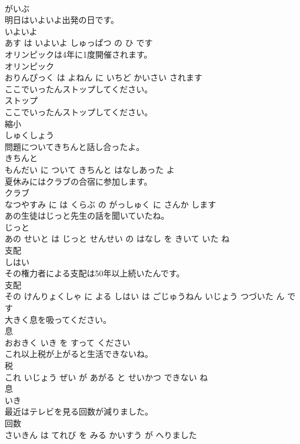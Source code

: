 \documentclass[8pt]{extreport}
\begin{document}
\begin{CJK}{UTF8}{min}
\\	がいぶ			
\\	明日はいよいよ出発の日です。	
\\	いよいよ 
\\	あす は いよいよ しゅっぱつ の ひ です			
\\	オリンピックは4年に1度開催されます。	
\\	オリンピック 
\\	おりんぴっく は よねん に いちど かいさい されます			
\\	ここでいったんストップしてください。	
\\	ストップ 
\\	ここでいったんストップしてください。			
\\	縮小	
\\	しゅくしょう			
\\	問題についてきちんと話し合ったよ。	
\\	きちんと 
\\	もんだい に ついて きちんと はなしあった よ			
\\	夏休みにはクラブの合宿に参加します。	
\\	クラブ 
\\	なつやすみ に は くらぶ の がっしゅく に さんか します			
\\	あの生徒はじっと先生の話を聞いていたね。	
\\	じっと 
\\	あの せいと は じっと せんせい の はなし を きいて いた ね			
\\	支配	
\\	しはい			
\\	その権力者による支配は50年以上続いたんです。	
\\	支配 
\\	その けんりょくしゃ に よる しはい は ごじゅうねん いじょう つづいた ん です			
\\	大きく息を吸ってください。	
\\	息 
\\	おおきく いき を すって ください			
\\	これ以上税が上がると生活できないね。	
\\	税 
\\	これ いじょう ぜい が あがる と せいかつ できない ね			
\\	息	
\\	いき			
\\	最近はテレビを見る回数が減りました。	
\\	回数 
\\	さいきん は てれび を みる かいすう が へりました			

\end{CJK}
\end{document}
